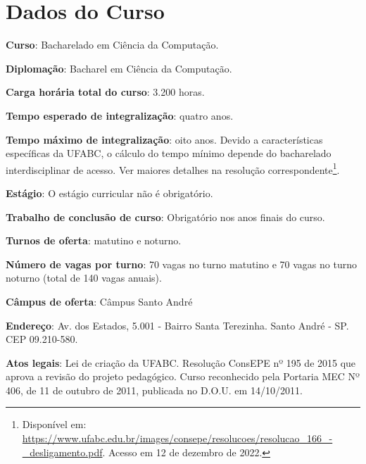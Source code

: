 \section{Dados do Curso}

\textbf{Curso}: Bacharelado em Ciência da Computação.

\textbf{Diplomação}: Bacharel em Ciência da Computação.

\textbf{Carga horária total do curso}: 3.200 horas.

\textbf{Tempo esperado de integralização}: quatro anos.  

\textbf{Tempo máximo de integralização}: oito anos. Devido a características
específicas da UFABC, o cálculo do tempo mínimo depende do bacharelado
interdisciplinar de acesso. Ver maiores detalhes na resolução
correspondente\footnote{Disponível em:
\url{https://www.ufabc.edu.br/images/consepe/resolucoes/resolucao_166_-_desligamento.pdf}.
Acesso em 12 de dezembro de 2022.}.

\textbf{Estágio}: O estágio curricular não é obrigatório.

\textbf{Trabalho de conclusão de curso}: Obrigatório nos anos finais do curso.

\textbf{Turnos de oferta}: matutino e noturno.

\textbf{Número de vagas por turno}: 70 vagas no turno matutino e 70 vagas no
turno noturno (total de 140 vagas anuais).

\textbf{Câmpus de oferta}: Câmpus Santo André

\textbf{Endereço}: Av. dos Estados, 5.001 - Bairro Santa Terezinha. Santo André
- SP. CEP 09.210-580.

\textbf{Atos legais}: Lei de criação da UFABC. Resolução ConsEPE nº 195 de 2015
que aprova a revisão do projeto pedagógico. Curso reconhecido pela Portaria MEC
Nº 406, de 11 de outubro de 2011, publicada no D.O.U. em 14/10/2011. 
